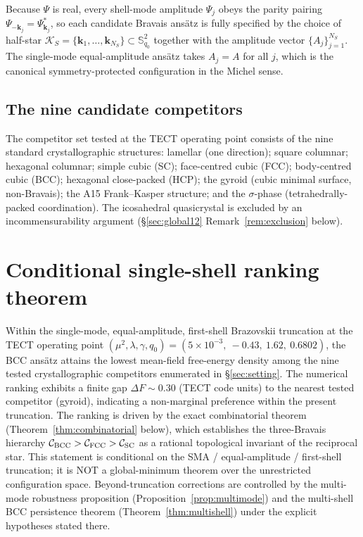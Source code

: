Because $\Psi$ is real, every shell-mode amplitude $\Psi_j$ obeys
the parity pairing $\Psi_{-\mathbf{k}_j} = \Psi_{\mathbf{k}_j}^*$, so
each candidate Bravais ans\"atz is fully specified by the choice of
half-star $\mathcal{K}_S = \{\mathbf{k}_1,\ldots,\mathbf{k}_{N_S}\}
\subset \mathbb{S}^2_{q_0}$ together with the amplitude vector
$\{A_j\}_{j=1}^{N_S}$. The single-mode equal-amplitude ans\"atz takes
$A_j = A$ for all $j$, which is the canonical
symmetry-protected configuration in the Michel sense.

\subsection{The nine candidate competitors}

The competitor set tested at the TECT operating point consists of the
nine standard crystallographic structures: lamellar (one direction);
square columnar; hexagonal columnar; simple cubic (SC); face-centred
cubic (FCC); body-centred cubic (BCC); hexagonal close-packed (HCP);
the gyroid (cubic minimal surface, non-Bravais); the A15
Frank--Kasper structure; and the $\sigma$-phase (tetrahedrally-packed
coordination). The icosahedral quasicrystal is excluded by an
incommensurability argument (\S\ref{sec:global12}
Remark~\ref{rem:exclusion} below).

\section{Conditional single-shell ranking
theorem}\label{sec:proof}

\begin{theorem}
\label{thm:main}
Within the single-mode, equal-amplitude, first-shell Brazovskii
truncation at the TECT operating point
$(\mu^2, \lambda, \gamma, q_0) = (5\times 10^{-3},\ -0.43,\ 1.62,\
0.6802)$, the BCC ans\"atz attains the lowest mean-field free-energy
density among the nine tested crystallographic competitors enumerated
in \S\ref{sec:setting}. The numerical ranking exhibits a finite gap
$\Delta F \sim 0.30$ (TECT code units) to the nearest tested
competitor (gyroid), indicating a non-marginal preference within the
present truncation. The ranking is driven by the exact combinatorial
theorem (Theorem~\ref{thm:combinatorial} below), which establishes the
three-Bravais hierarchy
$\mathcal{C}_{\rm BCC} > \mathcal{C}_{\rm FCC} > \mathcal{C}_{\rm SC}$
as a rational topological invariant of the reciprocal star.
This statement is conditional on the SMA / equal-amplitude /
first-shell truncation; it is NOT a global-minimum theorem over the
unrestricted configuration space. Beyond-truncation corrections are
controlled by the multi-mode robustness proposition
(Proposition~\ref{prop:multimode}) and the multi-shell BCC persistence
theorem (Theorem~\ref{thm:multishell}) under the explicit hypotheses
stated there.
\end{theorem}

